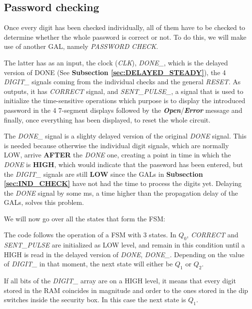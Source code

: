 \subsection{Password checking}
\label{sec:PASS_CHECK}

Once every digit has been checked individually, all of them have to be checked to determine whether the whole password is correct or not. To do this, we will make use of another GAL, namely \textit{PASSWORD CHECK}.
\medskip

The latter has as an input, the clock (\textit{CLK}), \textit{DONE\_}, which is the delayed version of DONE (See \textbf{Subsection \ref{sec:DELAYED_STEADY}}), the 4 \textit{DIGIT\_} signals coming from the individual checks and the general \textit{RESET}. As outputs, it has \textit{CORRECT} signal, and \textit{SENT\_PULSE\_}, a signal that is used to initialize the time-sensitive operations which purpose is to display the introduced password in the 4 7-segment displays followed by the \textbf{\textit{Open}}/\textbf{\textit{Error}} message and finally, once everything has been displayed, to reset the whole circuit.\medskip

The \textit{DONE\_} signal is a slighty delayed version of the original \textit{DONE} signal. This is needed because otherwise the individual digit signals, which are normally LOW, arrive \textbf{AFTER} the \textit{DONE} one, creating a point in time in which the \textit{DONE} is \textbf{HIGH}, which would indicate that the password has been entered, but the \textit{DIGIT\_} signals are still \textbf{LOW} since the GALs in \textbf{Subsection \ref{sec:IND_CHECK}} have not had the time to process the digits yet. Delaying the \textit{DONE} signal by some ms, a time higher than the propagation delay of the GALs, solves this problem.\bigskip

We will now go over all the states that form the FSM:

\medskip
\medskip

The code follows the operation of a FSM with 3 states. In \textit{$Q_0$}, \textit{CORRECT} and \textit{SENT\_PULSE} are initialized as LOW level, and remain in this condition until a HIGH is read in the delayed version of \textit{DONE}, \textit{DONE\_}. Depending on the value of \textit{DIGIT\_} in that moment, the next state will either be \textit{$Q_1$} or \textit{$Q_2$}.\medskip

If all bits of the \textit{DIGIT\_} array are on a HIGH level, it means that every digit stored in the RAM coincides in magnitude and order to the ones stored in the dip switches inside the security box. In this case the next state is \textit{$Q_1$}.\medskip

